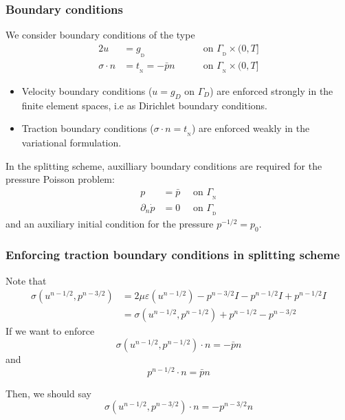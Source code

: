 \begin{frame}
  \frametitle{Boundary conditions}

  \vspace{1em}
  We consider boundary conditions of the type
  \begin{alignat*}{2}
    u &= g_{_\mathrm{D}} && \quad \text{ on } \Gamma_{_\mathrm{D}} \times (0, T] \\
    \sigma \cdot n &= t_{_\mathrm{N}} = - \bar{p} n  && \quad \text{ on } \Gamma_{_\mathrm{N}} \times (0, T]
  \end{alignat*}

  \begin{itemize}
  \item
    Velocity boundary conditions ($u = g_D$ on $\Gamma_D$) are
    enforced strongly in the finite element spaces, i.e as Dirichlet
    boundary conditions.
  \item
    Traction boundary conditions ($\sigma \cdot n = t_{_\mathrm{N}}$)
    are enforced weakly in the variational formulation.
  \end{itemize}

  In the splitting scheme, auxilliary boundary conditions are
  required for the pressure Poisson problem:
  \begin{align*}
    p &= \bar{p} \quad \text{ on } \Gamma_{_\mathrm{N}} \\
    \partial_n \dot{p} &= 0 \quad \text{ on } \Gamma_{_\mathrm{D}}
  \end{align*}
  and an auxiliary initial condition for the pressure $p^{-1/2} = p_0$.

\end{frame}

\begin{frame}
  \frametitle{Enforcing traction boundary conditions in splitting scheme}
  Note that
  \begin{equation*}
    \begin{split}
      \sigma(u^{n-1/2}, p^{n-3/2})
      &= 2 \mu \varepsilon (u^{n-1/2})  - p^{n-3/2} I - p^{n-1/2} I + p^{n-1/2} I \\
      &= \sigma(u^{n-1/2}, p^{n-1/2}) + p^{n-1/2} - p^{n-3/2}
    \end{split}
  \end{equation*}
  If we want to enforce
  \begin{equation*}
    \sigma(u^{n-1/2}, p^{n-1/2}) \cdot n = - \bar{p} n
  \end{equation*}
  and
  \begin{equation*}
    p^{n - 1/2} \cdot n = \bar{p} n
  \end{equation*}

  Then, we should say
  \begin{equation*}
    \sigma(u^{n-1/2}, p^{n-3/2}) \cdot n = - p^{n-3/2} n
  \end{equation*}
\end{frame}
